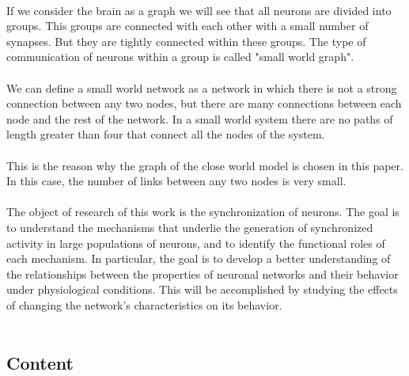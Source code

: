 \documentclass[draft]{article}
\newcommand\tab[1][1cm]{\hspace*{#1}}
\begin{document}
~\\
\tab If we consider the brain as a graph we will see that all neurons are divided into groups. This groups are connected with each other with a small number of synapses. But they are tightly connected within these groups. The type of communication of neurons within a group is called "small world graph".\\
~\\
\tab We can define a small world network as a network in which there is not a strong connection between any two nodes, but there are many connections between each node and the rest of the network. In a small world system there are no paths of length greater than four that connect all the nodes of the system.\\
~\\
\tab This is the reason why the graph of the close world model is chosen in this paper. In this case, the number of links between any two nodes is very small.\\
~\\
\tab The object of research of this work is the synchronization of neurons. The goal is to understand the mechanisms that underlie the generation of synchronized activity in large populations of neurons, and to identify the functional roles of each mechanism. In particular, the goal is to develop a better understanding of the relationships between the properties of neuronal networks and their behavior under physiological conditions. This will be accomplished by studying the effects of changing the network's characteristics on its behavior.\\
~\\
\newpage
\begin{center}
\section {Content}
\tableofcontents
\end{center}
\newpage
\end{document}
